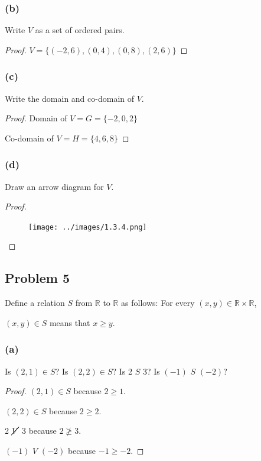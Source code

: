 \documentclass[14pt]{extarticle}
\newcommand{\R}{\mathbb{R}}
\begin{document}
\subsubsection{(b)}
Write $V$ as a set of ordered pairs.

\begin{proof}
    $V = \{(-2, 6), (0, 4), (0, 8), (2, 6)\}$
\end{proof}

\subsubsection{(c)}
Write the domain and co-domain of $V$.

\begin{proof}
    Domain of $V = G = \{-2, 0, 2\}$

    Co-domain of $V = H = \{4, 6, 8\}$
\end{proof}

\subsubsection{(d)}
Draw an arrow diagram for $V$.

\begin{proof}
    \begin{figure}[ht!]
        \centering
        \texttt{[image: ../images/1.3.4.png]}
    \end{figure}
\end{proof}

\subsection{Problem 5}
Define a relation $S$ from $\R$ to $\R$ as follows:
For every $(x, y) \in \R \times \R$,

\begin{center}
    $(x, y) \in S$ means that $x \geq y$.
\end{center}

\subsubsection{(a)}
Is $(2, 1) \in S$? Is $(2, 2) \in S$? Is 2 $S$ 3? Is $(-1)$ $S$ $(-2)$?

\begin{proof}
    $(2, 1) \in S$ because $2 \geq 1$.

    $(2, 2) \in S$ because $2 \geq 2$.

    2 $\cancel{V}$ 3 because $2 \ngeq 3$.

    $(-1)$ $V$ $(-2)$ because $-1 \geq -2$.
\end{proof}
\end{document}
